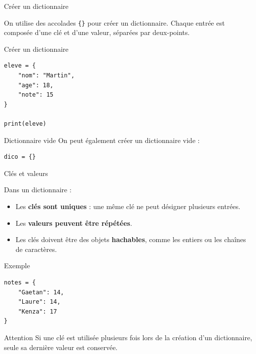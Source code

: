 \documentclass[10pt]{beamer}
\begin{document}
\begin{frame}[fragile]{Créer un dictionnaire}

On utilise des accolades \texttt{\{\}} pour créer un dictionnaire.
Chaque entrée est composée d'une clé et d'une valeur, séparées
par deux-points.

\begin{exampleblock}{Créer un dictionnaire}
\small
\begin{lstlisting}
eleve = {
    "nom": "Martin",
    "age": 18,
    "note": 15
}

print(eleve)
\end{lstlisting}
\end{exampleblock}

\begin{block}{Dictionnaire vide}
\small
On peut également créer un dictionnaire vide :
\begin{lstlisting}
dico = {}
\end{lstlisting}
\end{block}

\end{frame}
\begin{frame}[fragile]{Clés et valeurs}

Dans un dictionnaire :

\begin{itemize}
    \item Les \textbf{clés sont uniques} : une même clé ne peut
    désigner plusieurs entrées.
    \item Les \textbf{valeurs peuvent être répétées}.
    \item Les clés doivent être des objets \textbf{hachables},
    comme les entiers ou les chaînes de caractères.
\end{itemize}

\begin{exampleblock}{Exemple}
\small
\begin{lstlisting}
notes = {
    "Gaetan": 14,
    "Laure": 14,
    "Kenza": 17
}
\end{lstlisting}
\end{exampleblock}

\begin{alertblock}{Attention}
\small
Si une clé est utilisée plusieurs fois lors de la création
d'un dictionnaire, seule sa dernière valeur est conservée.
\end{alertblock}

\end{frame}
\end{document}

